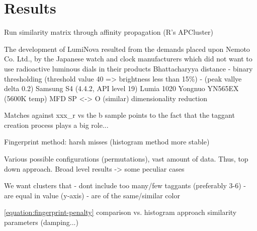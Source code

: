 \documentclass[thesis.tex]{subfiles}
\begin{document}
\chapter{Results}
\label{chapter:results}





Run similarity matrix through affinity propagation (R's APCluster)

The development of LumiNova resulted from the demands placed upon Nemoto  Co. Ltd.,  by the Japanese watch and clock manufacturers which did not want to use radioactive luminous dials in their products
Bhattacharyya distance
- binary thresholding (threshold value 40 => brightness less than 15\%)
- (peak vallye delta 0.2)
Samsung S4 (4.4.2, API level 19)
Lumia 1020
Yongnuo YN565EX (5600K temp)
MFD
SP <-> O (similar)
dimensionality reduction

Matches against xxx\_r vs the b sample points to the fact that the taggant creation process plays a big role...

Fingerprint method: harsh misses (histogram method more stable)

Various possible configurations (permutations), vast amount of data. Thus, top down approach. Broad level results -> some peculiar cases

We want clusters that
- dont include too many/few taggants (preferably 3-6)
- are equal in value (y-axis)
- are of the same/similar color

\ref{equation:fingerprint-penalty}
comparison vs. histogram approach
similarity parameters (damping...)
\end{document}
